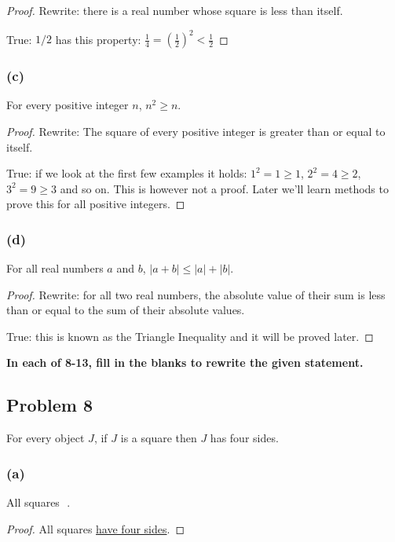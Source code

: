 \documentclass[14pt]{extarticle}
\newcommand{\dps}{\displaystyle}
\newcommand{\fbl}{\underline{\hspace{1cm}}\,\,}
\begin{document}
\begin{proof}
Rewrite: there is a real number whose square is less than itself.

True: $1/2$ has this property: $\dps \frac{1}{4} = \left(\frac{1}{2}\right)^2 <
\frac{1}{2}$
\end{proof}

\subsubsection{(c)}
For every positive integer $n$, $n^2 \geq n$.

\begin{proof}
Rewrite: The square of every positive integer is greater than or equal to
itself.

True: if we look at the first few examples it holds: $1^2 = 1 \geq 1$, $2^2 = 4
\geq 2$, $3^2 = 9 \geq 3$ and so on. This is however not a proof. Later we'll
learn methods to prove this for all positive integers.
\end{proof}

\subsubsection{(d)}
For all real numbers $a$ and $b$, $|a + b| \leq |a| + |b|$.

\begin{proof}
Rewrite: for all two real numbers, the absolute value of their sum is less than
or equal to the sum of their absolute values.

True: this is known as the Triangle Inequality and it will be proved later.
\end{proof}

{\bf In each of 8-13, fill in the blanks to rewrite the given statement.}

\subsection{Problem 8}
For every object $J$, if $J$ is a square then $J$ has four sides.

\subsubsection{(a)}
All squares \fbl.

\begin{proof}
All squares \underline{have four sides}.
\end{proof}
\end{document}
